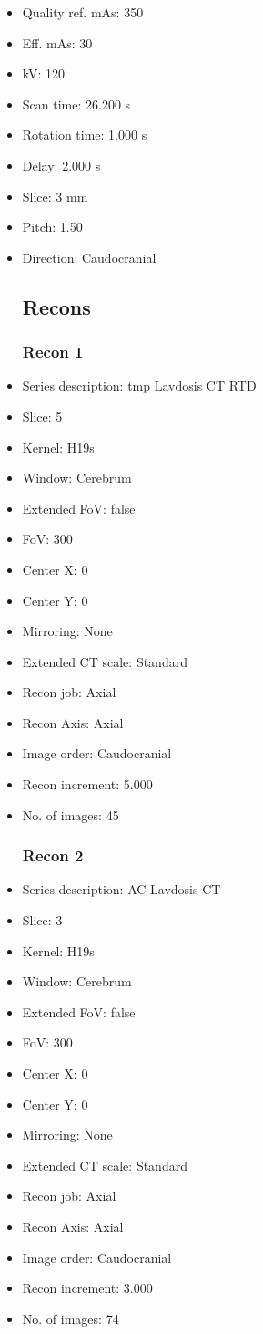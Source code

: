 \documentclass[12pt]{article}
\begin{document}
\begin{itemize}
\subsection{Scan}
\item Quality ref. mAs: 350\item Eff. mAs: 30\item kV: 120\item Scan time: 26.200 s\item Rotation time: 1.000 s\item Delay: 2.000 s\item Slice: 3 mm\item Pitch: 1.50\item Direction: Caudocranial\subsection{Recons}

\subsubsection{Recon 1}
\item Series description: tmp Lavdosis CT RTD
\item Slice: 5
\item Kernel: H19s
\item Window: Cerebrum
\item Extended FoV: false
\item FoV: 300
\item Center X: 0
\item Center Y: 0
\item Mirroring: None
\item Extended CT scale: Standard
\item Recon job: Axial
\item Recon Axis: Axial
\item Image order: Caudocranial
\item Recon increment: 5.000
\item No. of images: 45
\subsubsection{Recon 2}
\item Series description: AC Lavdosis CT
\item Slice: 3
\item Kernel: H19s
\item Window: Cerebrum
\item Extended FoV: false
\item FoV: 300
\item Center X: 0
\item Center Y: 0
\item Mirroring: None
\item Extended CT scale: Standard
\item Recon job: Axial
\item Recon Axis: Axial
\item Image order: Caudocranial
\item Recon increment: 3.000
\item No. of images: 74

\end{itemize}
\end{document}
